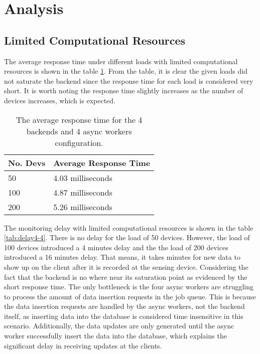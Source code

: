\documentclass[../thesis.tex]{subfiles}
\begin{document}
\section{Analysis}

\subsection{Limited Computational Resources}

The average response time under different loads with limited computational resources is shown in the table \ref{tab:avg4-4}. From the table, it is clear the given loads did not saturate the backend since the response time for each load is considered very short. It is worth noting the response time slightly increases as the number of devices increases, which is expected.

\begin{table}[h!]
	\begin{center}
		\caption{The average response time for the 4 backends and 4 async workers configuration.}
		\label{tab:avg4-4}
		\begin{tabular}{l|l}
			\toprule
			\textbf{No. Devs} & \textbf{Average Response Time}\\
			\midrule
			50 & 4.03 milliseconds\\
			100 & 4.87 milliseconds\\
			200 & 5.26 milliseconds\\
			\bottomrule
		\end{tabular}
	\end{center}
\end{table}

The monitoring delay with limited computational resources is shown in the table \ref{tab:delay4-4}. There is no delay for the load of 50 devices. However, the load of 100 devices introduced a 4 minutes delay and the the load of 200 devices introduced a 16 minutes delay. That means, it takes minutes for new data to show up on the client after it is recorded at the sensing device. Considering the fact that the backend is no where near its saturation point as evidenced by the short response time. The only bottleneck is the four async workers are struggling to process the amount of data insertion requests in the job queue. This is because the data insertion requests are handled by the async workers, not the backend itself, as inserting data into the database is considered time insensitive in this scenario. Additionally, the data updates are only generated until the async worker successfully insert the data into the database, which explains the significant delay in receiving updates at the clients. 
\end{document}
